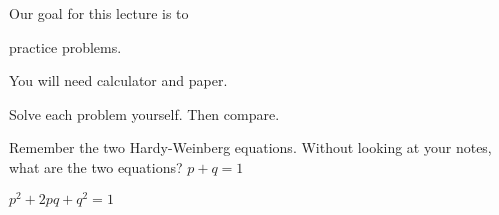\documentclass[t,handout]{beamer}  %
\begin{document}
\begin{frame}{Our goal for this lecture is to}
	
	\hangpara practice  problems.

	\hangpara You will need calculator and paper.

	\hangpara Solve each problem yourself. Then compare.
\end{frame}
%

\begin{frame}{Remember the two Hardy-Weinberg equations.}
	Without looking at your notes, what are the two equations?\pause
	\hangpara\huge$p+q=1$\pause

	\normalsize\vspace{2ex}
\hangpara\huge$p^2+2pq+q^2=1$

\end{frame}
%
\end{document}
